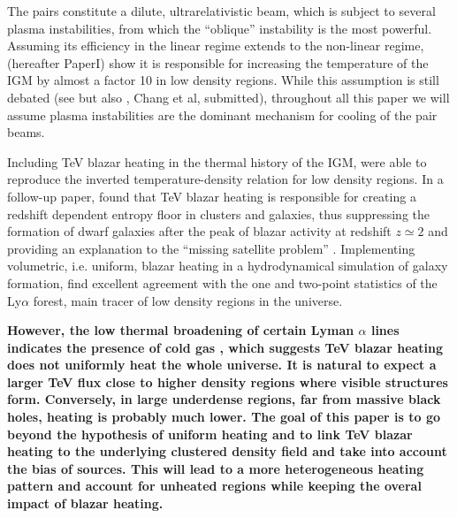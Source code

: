 \documentclass[twocolumns]{emulateapj}
\newcommand\ALc[1]{{\color{red} \bf #1}} %
\begin{document}
The pairs constitute a dilute, ultrarelativistic beam, which is subject to several plasma instabilities, from which the ``oblique'' instability \citep{PhysRevE.70.046401} is the most powerful. Assuming its efficiency in the linear regime extends to the non-linear regime, \citet{2012ApJ...752...23C} (hereafter PaperI) show it is responsible for increasing the temperature of the IGM by almost a factor 10 in low density regions. While this assumption is still debated (see \citet{2013ApJ...770...54M,2014ApJ...787...49S} but also \citet{2013arXiv1311.6752S,2013ApJ...777...49S,2012ApJ...758..102S}, Chang et al, submitted), throughout all this paper we will assume plasma instabilities are the dominant mechanism for cooling of the pair beams.


Including TeV blazar heating in the thermal history of the IGM, \citet{2012ApJ...752...23C} were able to reproduce the inverted temperature-density relation for low density regions. In a follow-up paper, \citet{2012ApJ...752...24P} found that TeV blazar heating is responsible for creating  a redshift dependent entropy floor in clusters and galaxies, thus suppressing the formation of dwarf galaxies after the peak of blazar activity at redshift $z\simeq2$ and providing an explanation to the ``missing satellite problem'' \citep{2010AdAst2010E...8K}. Implementing volumetric, i.e. uniform, blazar heating in a hydrodynamical simulation of galaxy formation, \citet{2012MNRAS.423..149P} find excellent agreement with the one and two-point statistics of the Ly$\alpha$ forest, main tracer of low density regions in the universe.

\ALc{However, the low thermal broadening of certain Lyman $\alpha$ lines indicates the presence of cold gas \citep{2012ApJ...757L..30R}, which suggests TeV blazar heating does not uniformly heat the whole universe.  It is natural to expect a larger TeV flux close to higher density regions where visible structures form. Conversely, in large underdense regions, far from massive black holes, heating is probably much lower. The goal of this paper is to go beyond the hypothesis of uniform heating and to link TeV blazar heating to the underlying clustered density field and take into account the bias of sources. This will lead to a more heterogeneous heating pattern and account for unheated regions while keeping the overal impact of blazar heating.
}
\end{document}
